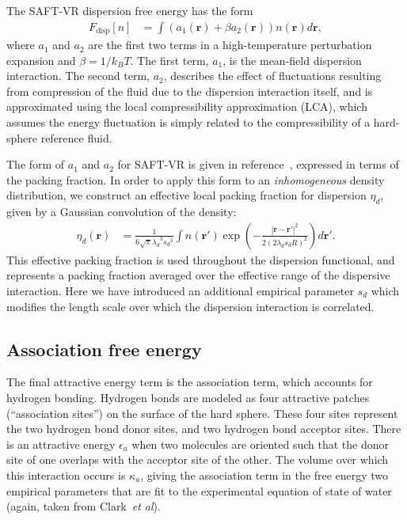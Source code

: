 \documentclass[twocolumn,amsmath,amssymb,prl]{revtex4-1}
\newcommand{\xx}{\textbf{r}}
\newcommand\etadisp{\ensuremath{\eta_\textit{d}}}
\newcommand\epsilonassoc{\ensuremath{\epsilon_\textit{a}}}
\newcommand\kappaassoc{\ensuremath{\kappa_\textit{a}}}
\newcommand\lambdadisp{\ensuremath{\lambda_\textit{d}}}
\newcommand\lscale{\ensuremath{s_d}}
\begin{document}
The SAFT-VR dispersion free energy has the form~\cite{gil-villegas-1997-SAFT-VR}
\begin{align}
  F_\text{disp}[n] &= \int \left(a_1(\xx) + \beta a_2(\xx)\right)n(\xx)d\xx,
\end{align}
where $a_1$ and $a_2$ are the first two terms in a high-temperature
perturbation expansion and $\beta=1/k_BT$.  The first term, $a_1$, is 
the mean-field dispersion interaction. The second term, $a_2$, describes the
effect of fluctuations resulting from compression of the fluid due
to the dispersion interaction itself, and is approximated
using the local compressibility approximation (LCA), which
assumes the energy fluctuation is simply related to the
compressibility of a hard-sphere reference fluid\cite{barker1976liquid}.

The form of $a_1$ and $a_2$ for SAFT-VR is given in
reference~\cite{gil-villegas-1997-SAFT-VR}, expressed in terms
of the packing fraction.  In order to apply this form to an
\emph{inhomogeneous} density distribution, we construct an effective local
packing fraction for dispersion $\etadisp$, given by a Gaussian
convolution of the density:
\begin{align}
  \etadisp(\xx) &= \frac{1}{6\sqrt{\pi} \lambdadisp^3\lscale^3}
  \int n(\xx')\exp\left({-\frac{|\xx-\xx'|^2}{2(2 \lambdadisp
      \lscale R)^2}}\right)d\xx'.
\end{align}
This effective packing fraction is used throughout the dispersion
functional, and represents a packing fraction averaged over the
effective range of the dispersive interaction.  Here we have
introduced an additional empirical parameter $\lscale$ which modifies
the length scale over which the dispersion interaction is correlated.

\subsection{Association free energy}
The final attractive energy term is the association term, which
accounts for hydrogen bonding.  Hydrogen bonds are modeled as four
attractive patches (``association sites'') on the surface of the hard
sphere.  These four sites represent the two hydrogen bond donor sites,
and two hydrogen bond acceptor sites.  There is an attractive energy
$\epsilonassoc$ when two molecules are oriented such that the donor site
of one overlaps with the acceptor site of the other.  The volume over
which this interaction occurs is $\kappaassoc$, giving the association
term in the free energy two empirical parameters that are fit to the
experimental equation of state of water (again, taken from
Clark~\emph{et al}\cite{clark2006developing}).
\end{document}
